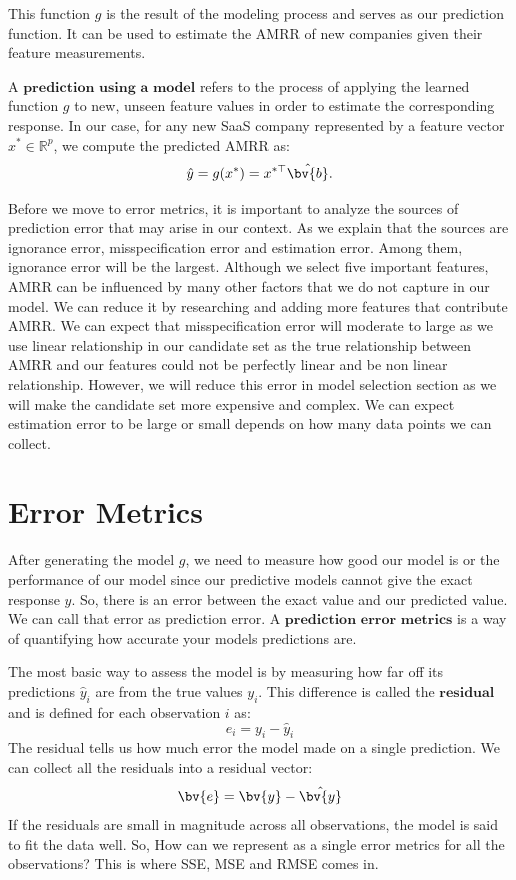 \documentclass[12pt]{article}
\begin{document}
This function \( g \) is the result of the modeling process and serves as our prediction function. It can be used to estimate the AMRR of new companies given their feature measurements.


A $\textbf{prediction using a model}$ refers to the process of applying the learned function \( g \) to new, unseen feature values in order to estimate the corresponding response. In our case, for any new SaaS company represented by a feature vector \( x^* \in \mathbb{R}^p \), we compute the predicted AMRR as:
\[
\hat{y} = g(x^*) = x^{*\top} \hat{\bv{b}}.
\]

Before we move to error metrics, it is important to analyze the sources of prediction error that may arise in our context. As we explain that the sources are ignorance error, misspecification error and estimation error. Among them, ignorance error will be the largest. Although we select five important features, AMRR can be influenced by many other factors that we do not capture in our model. We can reduce it by researching and adding more features that contribute AMRR. We can expect that misspecification error will moderate to large as we use linear relationship in our candidate set as the true relationship between AMRR and our features could not be perfectly linear and be non linear relationship. However, we will reduce this error in model selection section as we will make the candidate set more expensive and complex. We can expect estimation error to be large or small depends on how many data points we can collect.



\section{Error Metrics}

After generating the model $g$, we need to measure how good our model is or the performance of our model since our predictive models cannot give the exact response $y$. So, there is an error between the exact value and our predicted value. We can call that error as prediction error. A $\textbf{prediction error metrics}$ is a way of quantifying how accurate your models predictions are.

The most basic way to assess the model is by measuring how far off its predictions \( \hat{y}_i \) are from the true values \( y_i \). This difference is called the \(\textbf{residual}\) and is defined for each observation $i$ as:
\[
e_i = y_i - \hat{y}_i
\]
The residual tells us how much error the model made on a single prediction. We can collect all the residuals into a residual vector:
\[
\bv{e} = \bv{y} - \hat{\bv{y}}
\]
If the residuals are small in magnitude across all observations, the model is said to fit the data well. So, How can we represent as a single error metrics for all the observations? This is where SSE, MSE and RMSE comes in.
\end{document}
